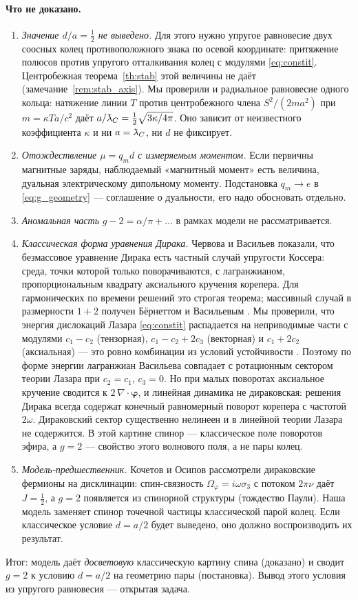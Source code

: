 \documentclass[12pt,a4paper]{article}
\providecommand{\lambdabar}{{\mkern0.75mu\mathchar'26\mkern-9.75mu\lambda}}
\begin{document}
\paragraph{Что не доказано.}
\begin{enumerate}[nosep]
\item \emph{Значение $d/a=\tfrac12$ не выведено.} Для этого нужно упругое
равновесие двух соосных колец противоположного знака по осевой координате:
притяжение полюсов против упругого отталкивания колец с модулями
\eqref{eq:constit}. Центробежная теорема~\ref{th:stab} этой величины не даёт
(замечание~\ref{rem:stab_axis}). Мы проверили и радиальное равновесие одного кольца:
натяжение линии $T$ против центробежного члена $S^2/(2ma^2)$ при $m=\kappa Ta/c^2$
даёт $a/\lambdabar_C=\tfrac12\sqrt{3\kappa/4\pi}$. Оно зависит от неизвестного
коэффициента $\kappa$ и ни $a=\lambdabar_C$, ни $d$ не фиксирует.
\item \emph{Отождествление $\mu=q_md$ с измеряемым моментом.} Если первичны
магнитные заряды, наблюдаемый «магнитный момент» есть величина, дуальная
электрическому дипольному моменту. Подстановка $q_m\to e$ в
\eqref{eq:g_geometry} --- соглашение о дуальности, его надо обосновать отдельно.
\item \emph{Аномальная часть} $g-2=\alpha/\pi+\dots$ в рамках модели не
рассматривается.
\item \emph{Классическая форма уравнения Дирака.} Черво\-ва и Васильев
\cite{vassiliev2009} показали, что безмассовое уравнение Дирака есть частный случай
упругости Коссера: среда, точки которой только поворачиваются, с лагранжианом,
пропорциональным квадрату аксиального кручения корепера. Для гармонических по времени
решений это строгая теорема; массивный случай в размерности $1+2$ получен Бёрнеттом и
Васильевым \cite{burnett2010}. Мы проверили, что энергия дислокаций Лазара
\eqref{eq:constit} распадается на неприводимые части с модулями $c_1-c_2$ (тензорная),
$c_1-c_2+2c_3$ (векторная) и $c_1+2c_2$ (аксиальная) --- это ровно комбинации из условий
устойчивости \cite{lazar2010pla}. Поэтому по форме энергии лагранжиан Васильева совпадает с ротационным сектором теории
Лазара при $c_2=c_1$, $c_3=0$. Но при малых поворотах аксиальное кручение сводится к
$2\,\nabla\cdot\boldsymbol\varphi$, и линейная динамика не дираковская: решения Дирака всегда
содержат конечный равномерный поворот корепера с частотой $2\omega$. Дираковский сектор
существенно нелинеен и в линейной теории Лазара не содержится. В этой картине спинор --- классическое
поле поворотов эфира, а $g=2$ --- свойство этого волнового поля, а не пары колец.
\item \emph{Модель-предшественник.} Кочетов и Осипов \cite{osipov2010}
рассмотрели дираковские фермионы на дисклинации: спин-связность
$\Omega_\varphi=i\omega\sigma_3$ с потоком $2\pi\nu$ даёт $J=\tfrac12$, а $g=2$
появляется из спинорной структуры (тождество Паули). Наша модель заменяет
спинор точечной частицы классической парой колец. Если классическое условие
$d=a/2$ будет выведено, оно должно воспроизводить их результат.
\end{enumerate}
Итог: модель даёт \emph{досветовую} классическую картину спина (доказано) и
сводит $g=2$ к условию $d=a/2$ на геометрию пары (постановка). Вывод этого
условия из упругого равновесия --- открытая задача.
\end{document}
